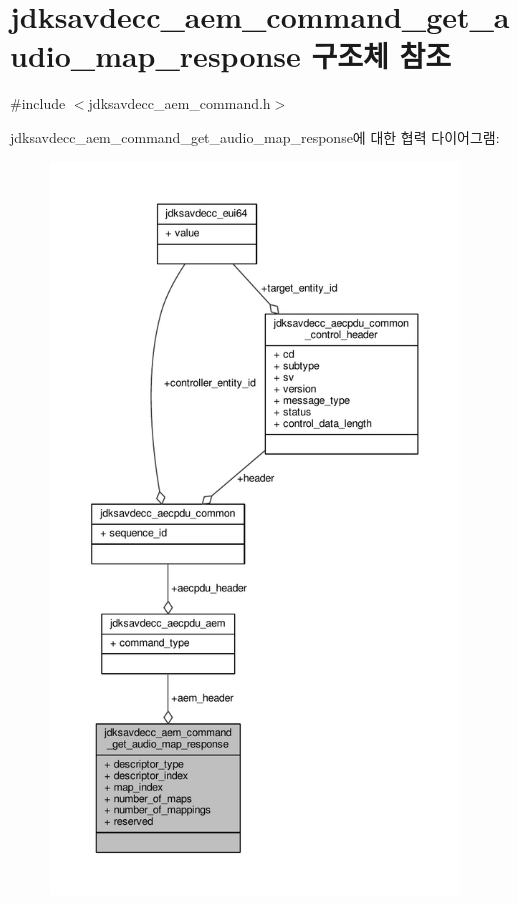 \hypertarget{structjdksavdecc__aem__command__get__audio__map__response}{}\section{jdksavdecc\+\_\+aem\+\_\+command\+\_\+get\+\_\+audio\+\_\+map\+\_\+response 구조체 참조}
\label{structjdksavdecc__aem__command__get__audio__map__response}


{\ttfamily \#include $<$jdksavdecc\+\_\+aem\+\_\+command.\+h$>$}



jdksavdecc\+\_\+aem\+\_\+command\+\_\+get\+\_\+audio\+\_\+map\+\_\+response에 대한 협력 다이어그램\+:
\nopagebreak
\begin{figure}[H]
\begin{center}
\leavevmode
\includegraphics[height=550pt]{structjdksavdecc__aem__command__get__audio__map__response__coll__graph}
\end{center}
\end{figure}
